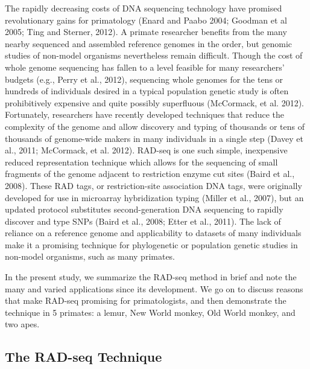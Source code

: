 \documentclass[12pt]{article}
\begin{document}
The rapidly decreasing costs of DNA sequencing technology have promised revolutionary gains for primatology (Enard and Paabo 2004; Goodman et al 2005; Ting and Sterner, 2012). A primate researcher benefits from the many nearby sequenced and assembled reference genomes in the order, but genomic studies of non-model organisms nevertheless remain difficult. Though the cost of whole genome sequencing has fallen to a level feasible for many researchers' budgets (e.g., Perry et al., 2012), sequencing whole genomes for the tens or hundreds of individuals desired in a typical population genetic study is often prohibitively expensive and quite possibly superfluous (McCormack, et al. 2012). Fortunately, researchers have recently developed techniques that reduce the complexity of the genome and allow discovery and typing of thousands or tens of thousands of genome-wide makers in many individuals in a single step (Davey et al., 2011; McCormack, et al. 2012). RAD-seq is one such simple, inexpensive reduced representation technique which allows for the sequencing of small fragments of the genome adjacent to restriction enzyme cut sites (Baird et al., 2008). These RAD tags, or restriction-site association DNA tags, were originally developed for use in microarray hybridization typing (Miller et al., 2007), but an updated protocol substitutes second-generation DNA sequencing to rapidly discover and type SNPs (Baird et al., 2008; Etter et al., 2011). The lack of reliance on a reference genome and applicability to datasets of many individuals make it a promising technique for phylogenetic or population genetic studies in non-model organisms, such as many primates.

In the present study, we summarize the RAD-seq method in brief and note the many and varied applications since its development. We go on to discuss reasons that make RAD-seq promising for primatologists, and then demonstrate the technique in 5 primates: a lemur, New World monkey, Old World monkey, and two apes.  

\subsection{The RAD-seq Technique}
\end{document}
